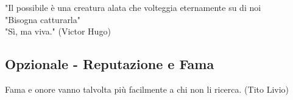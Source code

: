 \documentclass[a4paper,twoside,openany]{book}
\begin{document}
\begin{changemargin}{0.3cm}{0.3cm}\begin{tcolorbox}[enhanced,arc=5pt,boxrule=0.3pt]{"Il possibile è una creatura alata che volteggia eternamente su di noi\\
"Bisogna catturarla"\\
"Sì, ma viva." (Victor Hugo)}
\end{tcolorbox}\end{changemargin}\medskip

\subsection{Opzionale - Reputazione e Fama}


\begin{changemargin}{0.3cm}{0.3cm}\begin{enfasi}{
Fama e onore vanno talvolta più facilmente a chi non li ricerca. (Tito Livio)}\end{enfasi}\end{changemargin}\medskip
\end{document}
